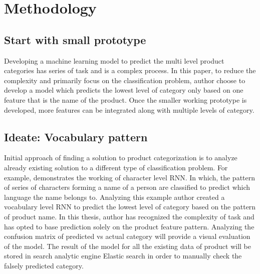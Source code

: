 \section{Methodology}

\subsection{Start with small prototype}

Developing a machine learning model to predict the multi level product categories has series of task and is a complex process. In this paper, to reduce the complexity and primarily focus on the classification problem, author choose to develop a model which predicts the lowest level of category only based on one feature that is the name of the product. Once the smaller working prototype is developed, more features can be integrated along with multiple levels of category. 


\subsection{Ideate: Vocabulary pattern}
Initial approach of finding a solution to product categorization is to analyze already existing solution to a different type of classification problem. For example, \parencite{sean} demonstrates the working of character level RNN. In which, the pattern of series of characters forming a name of a person are classified to predict which language the name belongs to. Analyzing this example author created a vocabulary level RNN to predict the lowest level of category based on the pattern of product name. In this thesis, author has recognized the complexity of task and has opted to base prediction solely on the product feature pattern. Analyzing the confusion matrix of predicted vs actual category will provide a visual evaluation of the model. The result of the model for all the existing data of product will be stored in search analytic engine Elastic search in order to manually check the falsely predicted category.

